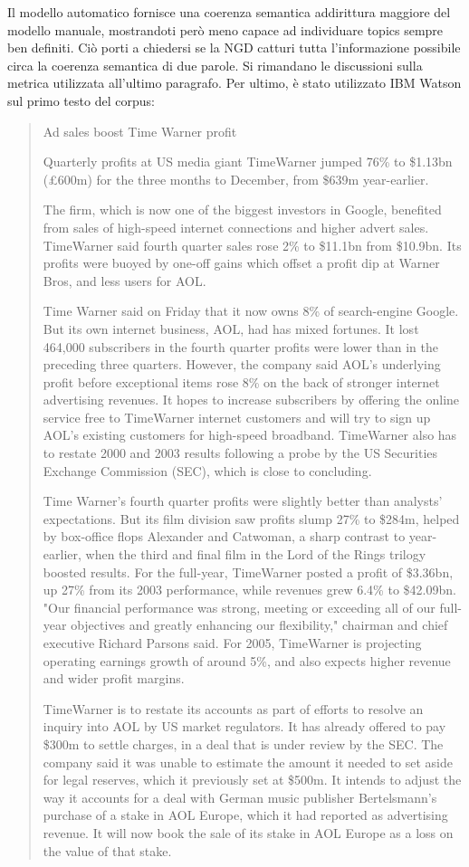 \documentclass[]{article}
\begin{document}
\newline
Il modello automatico fornisce una coerenza semantica addirittura maggiore del modello manuale, mostrandoti però meno capace ad individuare topics sempre ben definiti. Ciò porti a chiedersi se la NGD catturi tutta l'informazione possibile circa la coerenza semantica di due parole. Si rimandano le discussioni sulla metrica utilizzata all'ultimo paragrafo.
\newline
Per ultimo, è stato utilizzato IBM Watson sul primo testo del corpus:
{\footnotesize \blockquote{Ad sales boost Time Warner profit
	
	Quarterly profits at US media giant TimeWarner jumped 76\% to \$1.13bn (£600m) for the three months to December, from \$639m year-earlier.
	
	The firm, which is now one of the biggest investors in Google, benefited from sales of high-speed internet connections and higher advert sales. TimeWarner said fourth quarter sales rose 2\% to \$11.1bn from \$10.9bn. Its profits were buoyed by one-off gains which offset a profit dip at Warner Bros, and less users for AOL.
	
	Time Warner said on Friday that it now owns 8\% of search-engine Google. But its own internet business, AOL, had has mixed fortunes. It lost 464,000 subscribers in the fourth quarter profits were lower than in the preceding three quarters. However, the company said AOL's underlying profit before exceptional items rose 8\% on the back of stronger internet advertising revenues. It hopes to increase subscribers by offering the online service free to TimeWarner internet customers and will try to sign up AOL's existing customers for high-speed broadband. TimeWarner also has to restate 2000 and 2003 results following a probe by the US Securities Exchange Commission (SEC), which is close to concluding.
	
	Time Warner's fourth quarter profits were slightly better than analysts' expectations. But its film division saw profits slump 27\% to \$284m, helped by box-office flops Alexander and Catwoman, a sharp contrast to year-earlier, when the third and final film in the Lord of the Rings trilogy boosted results. For the full-year, TimeWarner posted a profit of \$3.36bn, up 27\% from its 2003 performance, while revenues grew 6.4\% to \$42.09bn. "Our financial performance was strong, meeting or exceeding all of our full-year objectives and greatly enhancing our flexibility," chairman and chief executive Richard Parsons said. For 2005, TimeWarner is projecting operating earnings growth of around 5\%, and also expects higher revenue and wider profit margins.
	
	TimeWarner is to restate its accounts as part of efforts to resolve an inquiry into AOL by US market regulators. It has already offered to pay \$300m to settle charges, in a deal that is under review by the SEC. The company said it was unable to estimate the amount it needed to set aside for legal reserves, which it previously set at \$500m. It intends to adjust the way it accounts for a deal with German music publisher Bertelsmann's purchase of a stake in AOL Europe, which it had reported as advertising revenue. It will now book the sale of its stake in AOL Europe as a loss on the value of that stake.
}}
\end{document}
